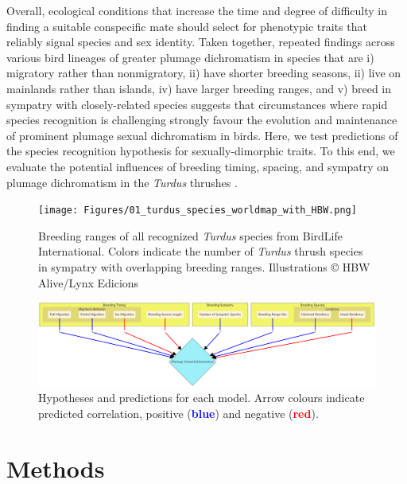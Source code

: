 \documentclass[
  a4paper,
]{article}
\begin{document}
Overall, ecological conditions that increase the time and degree of
difficulty in finding a suitable conspecific mate should select for
phenotypic traits that reliably signal species and sex identity. Taken
together, repeated findings across various bird lineages of greater
plumage dichromatism in species that are i) migratory rather than
nonmigratory, ii) have shorter breeding seasons, ii) live on mainlands
rather than islands, iv) have larger breeding ranges, and v) breed in
sympatry with closely-related species suggests that circumstances where
rapid species recognition is challenging strongly favour the evolution
and maintenance of prominent plumage sexual dichromatism in birds. Here,
we test predictions of the species recognition hypothesis for
sexually-dimorphic traits. To this end, we evaluate the potential
influences of breeding timing, spacing, and sympatry on plumage
dichromatism in the \emph{Turdus} thrushes .

\begin{figure}
\hypertarget{fig:fig-01-turdus-ranges}{%
\centering
\texttt{[image: Figures/01\_turdus\_species\_worldmap\_with\_HBW.png]}
\caption{Breeding ranges of all recognized \emph{Turdus} species from
BirdLife International. Colors indicate the number of \emph{Turdus}
thrush species in sympatry with overlapping breeding ranges.
Illustrations © HBW Alive/Lynx Edicions}\label{fig:fig-01-turdus-ranges}
}
\end{figure}

\begin{figure}[h]
\centering
\includegraphics[width=\textwidth,height=\textheight,keepaspectratio]{Figures/hypothesis-figure-mermaid.png}
\caption {Hypotheses and predictions for each model. Arrow colours indicate predicted correlation, positive (\textcolor{blue}{\textbf{blue}}) and negative (\textcolor{red}{\textbf{red}}).\label{fig:02-hypotheses}}
\end{figure}

\hypertarget{methods}{%
\section{Methods}\label{methods}}
\end{document}
